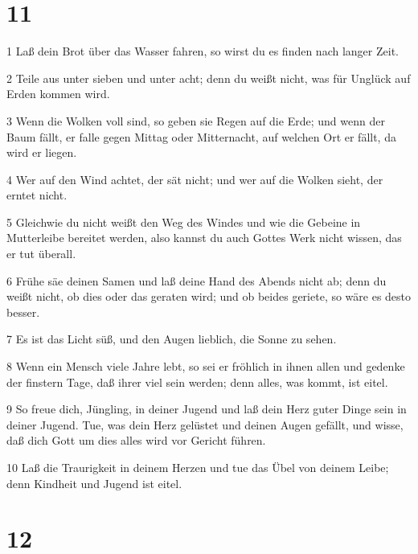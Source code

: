 \chapter{11}

\par 1 Laß dein Brot über das Wasser fahren, so wirst du es finden nach langer Zeit.
\par 2 Teile aus unter sieben und unter acht; denn du weißt nicht, was für Unglück auf Erden kommen wird.
\par 3 Wenn die Wolken voll sind, so geben sie Regen auf die Erde; und wenn der Baum fällt, er falle gegen Mittag oder Mitternacht, auf welchen Ort er fällt, da wird er liegen.
\par 4 Wer auf den Wind achtet, der sät nicht; und wer auf die Wolken sieht, der erntet nicht.
\par 5 Gleichwie du nicht weißt den Weg des Windes und wie die Gebeine in Mutterleibe bereitet werden, also kannst du auch Gottes Werk nicht wissen, das er tut überall.
\par 6 Frühe säe deinen Samen und laß deine Hand des Abends nicht ab; denn du weißt nicht, ob dies oder das geraten wird; und ob beides geriete, so wäre es desto besser.
\par 7 Es ist das Licht süß, und den Augen lieblich, die Sonne zu sehen.
\par 8 Wenn ein Mensch viele Jahre lebt, so sei er fröhlich in ihnen allen und gedenke der finstern Tage, daß ihrer viel sein werden; denn alles, was kommt, ist eitel.
\par 9 So freue dich, Jüngling, in deiner Jugend und laß dein Herz guter Dinge sein in deiner Jugend. Tue, was dein Herz gelüstet und deinen Augen gefällt, und wisse, daß dich Gott um dies alles wird vor Gericht führen.
\par 10 Laß die Traurigkeit in deinem Herzen und tue das Übel von deinem Leibe; denn Kindheit und Jugend ist eitel.

\chapter{12}

